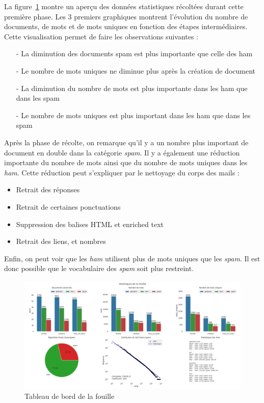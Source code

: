     La figure~\ref{fig:dashFouille} montre un aperçu des données statistiques récoltées durant cette première phase.
    Les 3 premiers graphiques montrent l'évolution du nombre de documents, de mots et de mots uniques en fonction des étapes intermédiaires.\\
    Cette visualisation permet de faire les observations suivantes :
    \begin{itemize}
        \item[-] La diminution des documents spam est plus importante que celle des ham
		\item[-] Le nombre de mots uniques ne diminue plus après la création de document
		\item[-] La diminution du nombre de mots est plus importante dans les ham que dans les spam
		\item[-] Le nombre de mots uniques est plus important dans les ham que dans les spam
    \end{itemize}
    Après la phase de récolte, on remarque qu'il y a un nombre plus important de document en double dans la catégorie \emph{spam}.
    Il y a également une réduction importante du nombre de mots ainsi que du nombre de mots uniques dans les \emph{ham}.
    Cette réduction peut s'expliquer par le nettoyage du corps des mails :
    \begin{itemize}
        \item Retrait des réponses
        \item Retrait de certaines ponctuations
        \item Suppression des balises HTML et enriched text
        \item Retrait des liens, et nombres
    \end{itemize}

    Enfin, on peut voir que les \emph{ham} utilisent plus de mots uniques que les \emph{spam}.
    Il est donc possible que le vocabulaire des \emph{spam} soit plus restreint.
    \begin{figure}[H]
        \includegraphics[width=\linewidth]{img/fouilleStats}
        \caption{Tableau de bord de la fouille}
        \label{fig:dashFouille}
    \end{figure}

